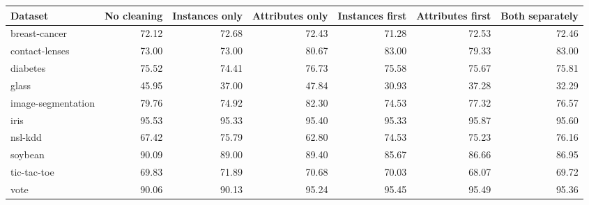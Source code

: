\begin{tabular}{lrrrrrr}
\toprule
Dataset & No cleaning & Instances only & Attributes only & Instances first & Attributes first & Both separately \\
\midrule
breast-cancer & 72.12 & 72.68 & 72.43 & 71.28 & 72.53 & 72.46 \\
contact-lenses & 73.00 & 73.00 & 80.67 & 83.00 & 79.33 & 83.00 \\
diabetes & 75.52 & 74.41 & 76.73 & 75.58 & 75.67 & 75.81 \\
glass & 45.95 & 37.00 & 47.84 & 30.93 & 37.28 & 32.29 \\
image-segmentation & 79.76 & 74.92 & 82.30 & 74.53 & 77.32 & 76.57 \\
iris & 95.53 & 95.33 & 95.40 & 95.33 & 95.87 & 95.60 \\
nsl-kdd & 67.42 & 75.79 & 62.80 & 74.53 & 75.23 & 76.16 \\
soybean & 90.09 & 89.00 & 89.40 & 85.67 & 86.66 & 86.95 \\
tic-tac-toe & 69.83 & 71.89 & 70.68 & 70.03 & 68.07 & 69.72 \\
vote & 90.06 & 90.13 & 95.24 & 95.45 & 95.49 & 95.36 \\
\bottomrule
\end{tabular}
